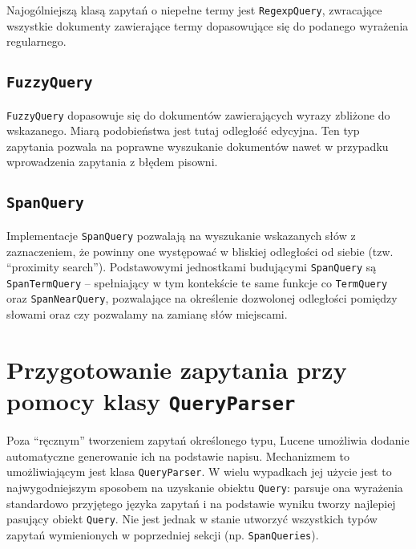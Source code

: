 Najogólniejszą klasą zapytań o niepełne termy jest \texttt{RegexpQuery}, zwracające wszystkie dokumenty zawierające termy dopasowujące się do podanego wyrażenia regularnego.

\subsection{\texttt{FuzzyQuery}}

\texttt{FuzzyQuery} dopasowuje się do dokumentów zawierających wyrazy zbliżone do wskazanego. Miarą podobieństwa jest tutaj odległość edycyjna. Ten typ zapytania pozwala na poprawne wyszukanie dokumentów nawet w przypadku wprowadzenia zapytania z błędem pisowni.

\subsection{\texttt{SpanQuery}}

Implementacje \texttt{SpanQuery} pozwalają na wyszukanie wskazanych słów z zaznaczeniem, że powinny one występować w bliskiej odległości od siebie (tzw. ``proximity search''). Podstawowymi jednostkami budującymi \texttt{SpanQuery} są \texttt{SpanTermQuery} -- spełniający w tym kontekście te same funkcje co \texttt{TermQuery} oraz \texttt{SpanNearQuery}, pozwalające na określenie dozwolonej odległości pomiędzy słowami oraz czy pozwalamy na zamianę słów miejscami.

\section{Przygotowanie zapytania przy pomocy klasy \texttt{QueryParser}}

Poza ``ręcznym'' tworzeniem zapytań określonego typu, Lucene umożliwia dodanie automatyczne generowanie ich na podstawie napisu. Mechanizmem to umożliwiającym jest klasa \texttt{QueryParser}. W wielu wypadkach jej użycie jest to najwygodniejszym sposobem na uzyskanie obiektu \texttt{Query}: parsuje ona wyrażenia standardowo przyjętego języka zapytań i na podstawie wyniku tworzy najlepiej pasujący obiekt \texttt{Query}. Nie jest jednak w stanie utworzyć wszystkich typów zapytań wymienionych w poprzedniej sekcji (np. \texttt{SpanQueries}).
